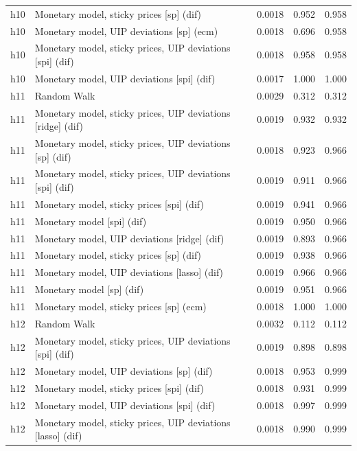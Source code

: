 \begin{ThreePartTable}
\begin{longtable}[t]{cp{5.5cm}ccc}
h10 & \raggedright Monetary model, sticky prices [sp] (dif) & 0.0018 & 0.952 & 0.958\\
h10 & \raggedright Monetary model, UIP deviations [sp] (ecm) & 0.0018 & 0.696 & 0.958\\
h10 & \raggedright Monetary model, sticky prices, UIP deviations [spi] (dif) & 0.0018 & 0.958 & 0.958\\
h10 & \raggedright Monetary model, UIP deviations [spi] (dif) & 0.0017 & 1.000 & 1.000\\
\addlinespace
h11 & \raggedright Random Walk & 0.0029 & 0.312 & 0.312\\
h11 & \raggedright Monetary model, sticky prices, UIP deviations [ridge] (dif) & 0.0019 & 0.932 & 0.932\\
h11 & \raggedright Monetary model, sticky prices, UIP deviations [sp] (dif) & 0.0018 & 0.923 & 0.966\\
h11 & \raggedright Monetary model, sticky prices, UIP deviations [spi] (dif) & 0.0019 & 0.911 & 0.966\\
h11 & \raggedright Monetary model, sticky prices [spi] (dif) & 0.0019 & 0.941 & 0.966\\
h11 & \raggedright Monetary model [spi] (dif) & 0.0019 & 0.950 & 0.966\\
h11 & \raggedright Monetary model, UIP deviations [ridge] (dif) & 0.0019 & 0.893 & 0.966\\
h11 & \raggedright Monetary model, sticky prices [sp] (dif) & 0.0019 & 0.938 & 0.966\\
h11 & \raggedright Monetary model, UIP deviations [lasso] (dif) & 0.0019 & 0.966 & 0.966\\
h11 & \raggedright Monetary model [sp] (dif) & 0.0019 & 0.951 & 0.966\\
h11 & \raggedright Monetary model, sticky prices [sp] (ecm) & 0.0018 & 1.000 & 1.000\\
\addlinespace
h12 & \raggedright Random Walk & 0.0032 & 0.112 & 0.112\\
h12 & \raggedright Monetary model, sticky prices, UIP deviations [spi] (dif) & 0.0019 & 0.898 & 0.898\\
h12 & \raggedright Monetary model, UIP deviations [sp] (dif) & 0.0018 & 0.953 & 0.999\\
h12 & \raggedright Monetary model, sticky prices [spi] (dif) & 0.0018 & 0.931 & 0.999\\
h12 & \raggedright Monetary model, UIP deviations [spi] (dif) & 0.0018 & 0.997 & 0.999\\
h12 & \raggedright Monetary model, sticky prices, UIP deviations [lasso] (dif) & 0.0018 & 0.990 & 0.999\\

\end{longtable}
\end{ThreePartTable}
